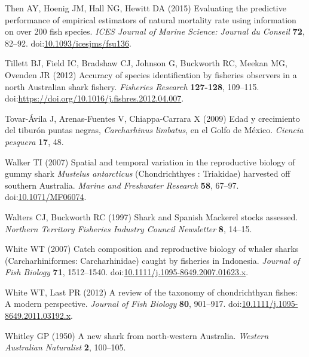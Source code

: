\documentclass[]{article}
\begin{document}
\leavevmode\hypertarget{ref-then_evaluating_2015}{}%
Then AY, Hoenig JM, Hall NG, Hewitt DA (2015) Evaluating the predictive
performance of empirical estimators of natural mortality rate using
information on over 200 fish species. \emph{ICES Journal of Marine
Science: Journal du Conseil} \textbf{72}, 82--92.
doi:\href{https://doi.org/10.1093/icesjms/fsu136}{10.1093/icesjms/fsu136}.

\leavevmode\hypertarget{ref-tillett_accuracy_2012}{}%
Tillett BJ, Field IC, Bradshaw CJ, Johnson G, Buckworth RC, Meekan MG,
Ovenden JR (2012) Accuracy of species identification by fisheries
observers in a north Australian shark fishery. \emph{Fisheries Research}
\textbf{127-128}, 109--115.
doi:\href{https://doi.org/https://doi.org/10.1016/j.fishres.2012.04.007}{https://doi.org/10.1016/j.fishres.2012.04.007}.

\leavevmode\hypertarget{ref-tovar-avila_edad_2009}{}%
Tovar-Ávila J, Arenas-Fuentes V, Chiappa-Carrara X (2009) Edad y
crecimiento del tiburón puntas negras, \emph{Carcharhinus limbatus}, en
el Golfo de México. \emph{Ciencia pesquera} \textbf{17}, 48.

\leavevmode\hypertarget{ref-walker_spatial_2007}{}%
Walker TI (2007) Spatial and temporal variation in the reproductive
biology of gummy shark \emph{Mustelus antarcticus} (Chondrichthyes :
Triakidae) harvested off southern Australia. \emph{Marine and Freshwater
Research} \textbf{58}, 67--97.
doi:\href{https://doi.org/10.1071/MF06074}{10.1071/MF06074}.

\leavevmode\hypertarget{ref-walters_shark_1997}{}%
Walters CJ, Buckworth RC (1997) Shark and Spanish Mackerel stocks
assessed. \emph{Northern Territory Fisheries Industry Council
Newsletter} \textbf{8}, 14--15.

\leavevmode\hypertarget{ref-white_catch_2007}{}%
White WT (2007) Catch composition and reproductive biology of whaler
sharks (Carcharhiniformes: Carcharhinidae) caught by fisheries in
Indonesia. \emph{Journal of Fish Biology} \textbf{71}, 1512--1540.
doi:\href{https://doi.org/10.1111/j.1095-8649.2007.01623.x}{10.1111/j.1095-8649.2007.01623.x}.

\leavevmode\hypertarget{ref-white_review_2012}{}%
White WT, Last PR (2012) A review of the taxonomy of chondrichthyan
fishes: A modern perspective. \emph{Journal of Fish Biology}
\textbf{80}, 901--917.
doi:\href{https://doi.org/10.1111/j.1095-8649.2011.03192.x}{10.1111/j.1095-8649.2011.03192.x}.

\leavevmode\hypertarget{ref-whitley_new_1950}{}%
Whitley GP (1950) A new shark from north-western Australia.
\emph{Western Australian Naturalist} \textbf{2}, 100--105.
\end{document}
